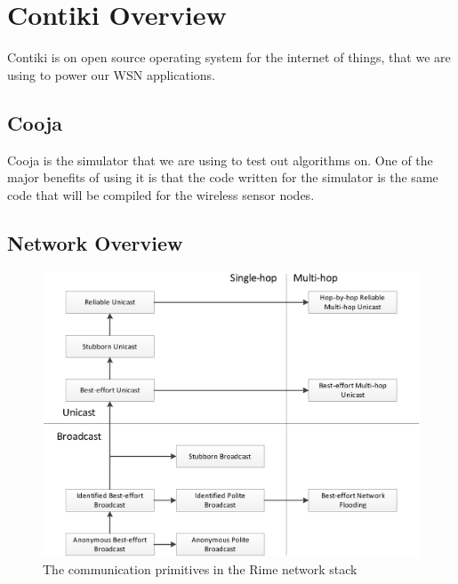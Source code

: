 \section{Contiki Overview}

Contiki \cite{?} is on open source operating system for the internet of things, that we are using to power our WSN applications.

\subsection{Cooja}

Cooja \cite{?} is the simulator that we are using to test out algorithms on. One of the major benefits of using it is that the code written for the simulator is the same code that will be compiled for the wireless sensor nodes.

\subsection{Network Overview}

\begin{figure}[H]
	\centering
	\includegraphics[width=\textwidth]{Diagrams/rime-stack}
	\caption{The communication primitives in the Rime network stack \cite{Dunkels:2007:ACA:1322263.1322295}}
\end{figure}

